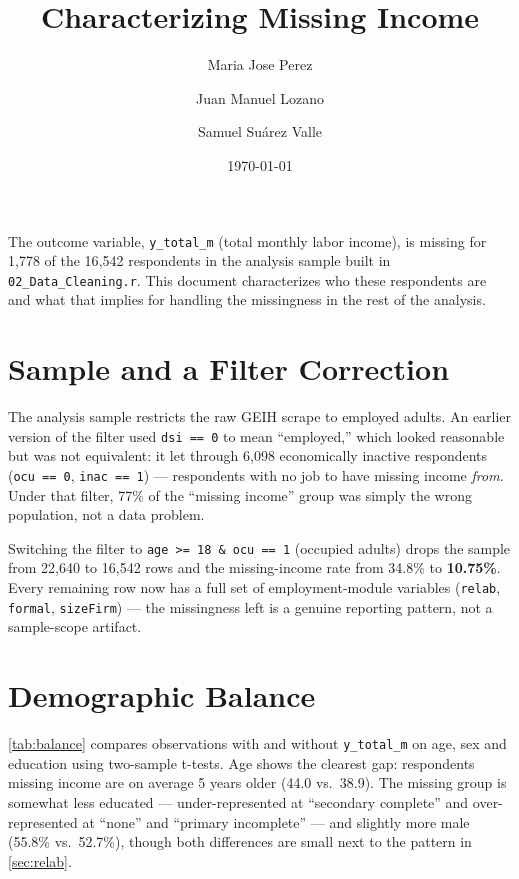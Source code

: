 \documentclass[11pt]{article}
\title{Characterizing Missing Income}
\author{Maria Jose Perez \and Juan Manuel Lozano \and Samuel Suárez Valle}
\date{\today}
\begin{document}
\maketitle

\noindent
The outcome variable, \texttt{y\_total\_m} (total monthly labor income), is missing for
1{,}778 of the 16{,}542 respondents in the analysis sample built in
\texttt{02\_Data\_Cleaning.r}. This document characterizes who these respondents are and
what that implies for handling the missingness in the rest of the analysis.

\section{Sample and a Filter Correction}

The analysis sample restricts the raw GEIH scrape to employed adults. An earlier version
of the filter used \texttt{dsi == 0} to mean ``employed,'' which looked reasonable but
was not equivalent: it let through 6{,}098 economically inactive respondents
(\texttt{ocu == 0}, \texttt{inac == 1}) --- respondents with no job to have missing income
\emph{from}. Under that filter, 77\% of the ``missing income'' group was simply the wrong
population, not a data problem.

Switching the filter to \texttt{age >= 18 \&\ ocu == 1} (occupied adults) drops the sample
from 22{,}640 to 16{,}542 rows and the missing-income rate from 34.8\% to
\textbf{10.75\%}. Every remaining row now has a full set of employment-module variables
(\texttt{relab}, \texttt{formal}, \texttt{sizeFirm}) --- the missingness left is a genuine
reporting pattern, not a sample-scope artifact.

\section{Demographic Balance}

\autoref{tab:balance} compares observations with and without \texttt{y\_total\_m} on age,
sex and education using two-sample t-tests. Age shows the clearest gap: respondents
missing income are on average 5 years older (44.0 vs.\ 38.9). The missing group is
somewhat less educated --- under-represented at ``secondary complete'' and over-represented
at ``none'' and ``primary incomplete'' --- and slightly more male (55.8\% vs.\ 52.7\%),
though both differences are small next to the pattern in \autoref{sec:relab}.


\end{document}
